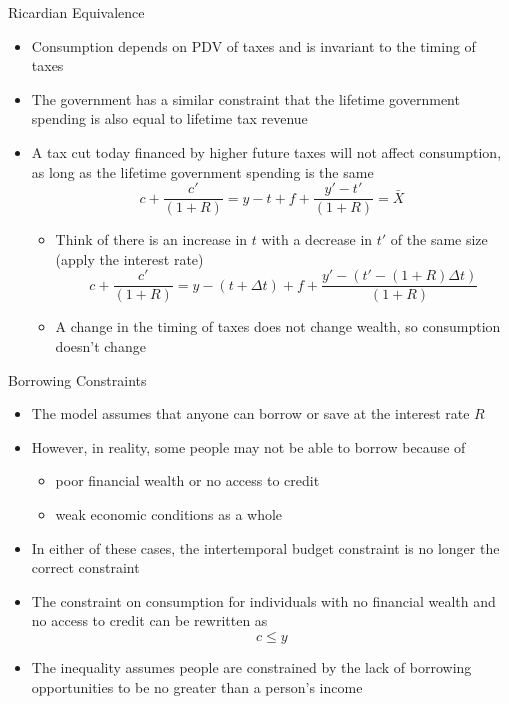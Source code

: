 \documentclass[aspectratio=1610]{beamer}
\begin{document}
\begin{frame}[wide]{Ricardian Equivalence}
	\begin{itemize}
		\item Consumption depends on PDV of taxes and is invariant to the timing of taxes
		\item The government has a similar constraint that the lifetime government spending is also equal to lifetime tax revenue
		\item A tax cut today financed by higher future taxes will not affect consumption, as long as the lifetime government spending is the same
		\[c+\frac{c'}{(1+R)}  = y -t +f + \frac{y'-t'}{(1+R)} = \bar{X}\]
		\begin{itemize}
			\item Think of there is an increase in $t$ with a decrease in $t'$ of the same size (apply the interest rate)
			\[c+\frac{c'}{(1+R)}  = y -(t+\Delta t) +f + \frac{y'-(t'-(1+R)\Delta t)}{(1+R)}\]
			\item A change in the timing of taxes does not change wealth, so consumption doesn’t change
		\end{itemize}
	\end{itemize}
\end{frame}

\begin{frame}[wide]{Borrowing Constraints}
	\begin{itemize}
		\item The model assumes that anyone can borrow or save at the interest rate $R$
		\item However, in reality, some people may not be able to borrow because of 
		\begin{itemize}
			\item poor financial wealth or no access to credit
			\item weak economic conditions as a whole 
		\end{itemize}
		\item In either of these cases, the intertemporal budget constraint is no longer the correct constraint
		\item The constraint on consumption for individuals with no financial wealth and no access to credit can be rewritten as
		\[c\leq y\]
		\item The inequality assumes people are constrained by the lack of borrowing opportunities to be no greater than a person’s income
	\end{itemize}
\end{frame}
\end{document}
